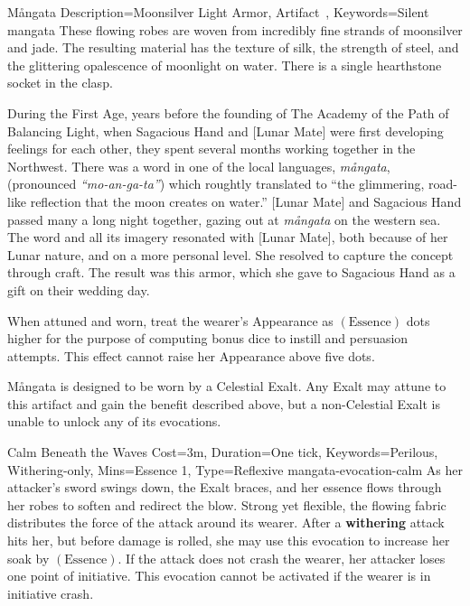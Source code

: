 ﻿

\begin{Merit}{Mångata}{
    Description={Moonsilver Light Armor, Artifact~},
    Keywords=Silent
}{mangata}
These flowing robes are woven from incredibly fine strands of moonsilver and
jade. The resulting material has the texture of silk, the strength of steel,
and the glittering opalescence of moonlight on water. There is a single
hearthstone socket in the clasp.

During the First Age, years before the founding of The Academy of the Path of
Balancing Light, when Sagacious Hand and [Lunar Mate] were first developing
feelings for each other, they spent several months working together in the
Northwest. There was a word in one of the local languages, \textit{mångata},
(pronounced \textit{``mo-an-ga-ta''}) which roughtly translated to ``the
glimmering, road-like reflection that the moon creates on water.'' [Lunar Mate]
and Sagacious Hand passed many a long night together, gazing out at
\textit{mångata} on the western sea. The word and all its imagery resonated
with [Lunar Mate], both because of her Lunar nature, and on a more personal
level. She resolved to capture the concept through craft. The result was this
armor, which she gave to Sagacious Hand as a gift on their wedding day.


When attuned and worn, treat the wearer's Appearance as $(\mathrm{Essence})$
dots higher for the purpose of computing bonus dice to instill and persuasion
attempts. This effect cannot raise her Appearance above five dots.

Mångata is designed to be worn by a Celestial Exalt. Any Exalt may attune to
this artifact and gain the benefit described above, but a non-Celestial Exalt
is unable to unlock any of its evocations.

\begin{Charm}{Calm Beneath the Waves}{
    Cost=3m,
    Duration=One tick,
    Keywords={Perilous, Withering-only},
    Mins=Essence 1,
    Type=Reflexive
}{mangata-evocation-calm}
As her attacker's sword swings down, the Exalt braces, and her essence flows
through her robes to soften and redirect the blow. Strong yet flexible, the
flowing fabric distributes the force of the attack around its wearer. After a
\textbf{withering} attack hits her, but before damage is rolled, she may use
this evocation to increase her soak by $(\mathrm{Essence})$. If the attack does
not crash the wearer, her attacker loses one point of initiative. This
evocation cannot be activated if the wearer is in initiative crash.
\end{Charm}


\end{Merit}
